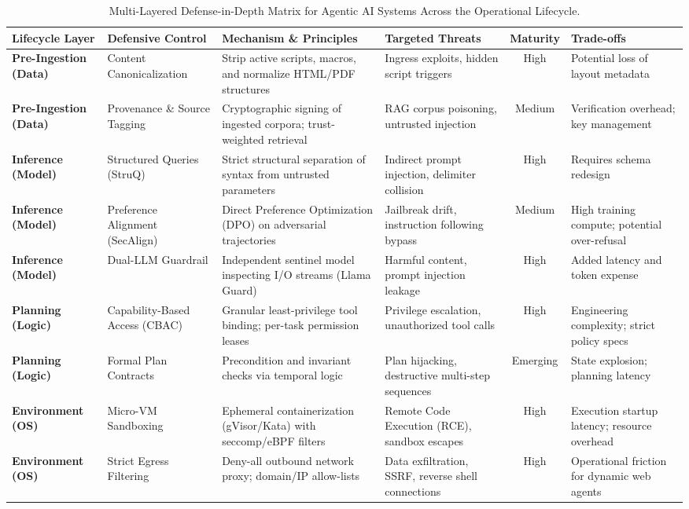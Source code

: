\begin{table}[t]
\centering
\caption{Multi-Layered Defense-in-Depth Matrix for Agentic AI Systems Across the Operational Lifecycle.}
\label{tab:defenses_matrix}
\footnotesize
\begin{tabularx}{\columnwidth}{l p{2.1cm} X X c p{1.8cm}}
\toprule
\textbf{Lifecycle Layer} & \textbf{Defensive Control} & \textbf{Mechanism \& Principles} & \textbf{Targeted Threats} & \textbf{Maturity} & \textbf{Trade-offs} \\
\midrule
\textbf{Pre-Ingestion (Data)} & Content Canonicalization & Strip active scripts, macros, and normalize HTML/PDF structures & Ingress exploits, hidden script triggers & High & Potential loss of layout metadata \\
\textbf{Pre-Ingestion (Data)} & Provenance \& Source Tagging & Cryptographic signing of ingested corpora; trust-weighted retrieval & RAG corpus poisoning, untrusted injection & Medium & Verification overhead; key management \\
\textbf{Inference (Model)} & Structured Queries (StruQ) & Strict structural separation of syntax from untrusted parameters & Indirect prompt injection, delimiter collision & High & Requires schema redesign \\
\textbf{Inference (Model)} & Preference Alignment (SecAlign) & Direct Preference Optimization (DPO) on adversarial trajectories & Jailbreak drift, instruction following bypass & Medium & High training compute; potential over-refusal \\
\textbf{Inference (Model)} & Dual-LLM Guardrail & Independent sentinel model inspecting I/O streams (Llama Guard) & Harmful content, prompt injection leakage & High & Added latency and token expense \\
\textbf{Planning (Logic)} & Capability-Based Access (CBAC) & Granular least-privilege tool binding; per-task permission leases & Privilege escalation, unauthorized tool calls & High & Engineering complexity; strict policy specs \\
\textbf{Planning (Logic)} & Formal Plan Contracts & Precondition and invariant checks via temporal logic & Plan hijacking, destructive multi-step sequences & Emerging & State explosion; planning latency \\
\textbf{Environment (OS)} & Micro-VM Sandboxing & Ephemeral containerization (gVisor/Kata) with seccomp/eBPF filters & Remote Code Execution (RCE), sandbox escapes & High & Execution startup latency; resource overhead \\
\textbf{Environment (OS)} & Strict Egress Filtering & Deny-all outbound network proxy; domain/IP allow-lists & Data exfiltration, SSRF, reverse shell connections & High & Operational friction for dynamic web agents \\

\end{tabularx}
\end{table}
